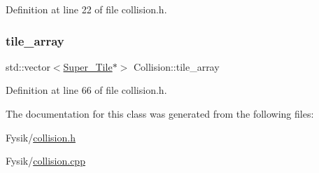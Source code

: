 Definition at line 22 of file collision.\+h.

\hypertarget{class_collision_aeccb982593f8dd6bb4c1d43198eb83d2}{}\label{class_collision_aeccb982593f8dd6bb4c1d43198eb83d2} 
\subsubsection{\texorpdfstring{tile\+\_\+array}{tile\_array}}
{\footnotesize\ttfamily std\+::vector$<$\hyperlink{class_super___tile}{Super\+\_\+\+Tile}$\ast$$>$ Collision\+::tile\+\_\+array}



Definition at line 66 of file collision.\+h.



The documentation for this class was generated from the following files\+:\begin{DoxyCompactItemize}
\item 
Fysik/\hyperlink{collision_8h}{collision.\+h}\item 
Fysik/\hyperlink{collision_8cpp}{collision.\+cpp}\end{DoxyCompactItemize}
